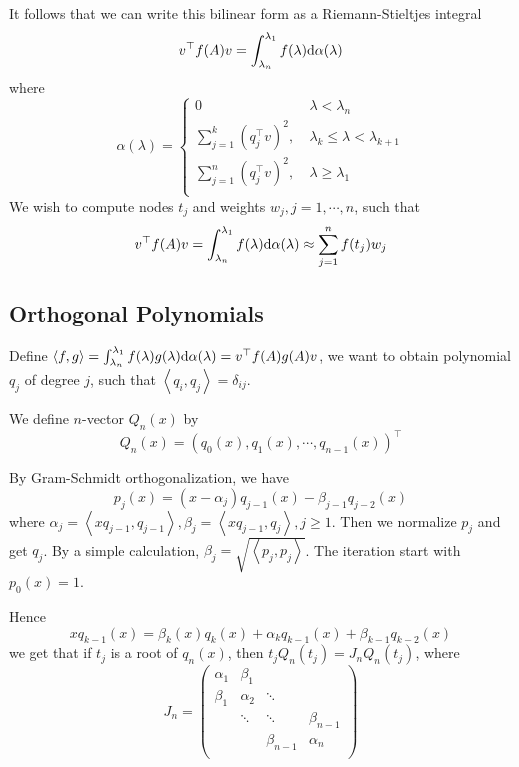 \documentclass[conference]{IEEEtran}
\DeclareMathOperator{\1}{\mathbf{1}}
\theoremstyle{definition}
\begin{document}
It follows that we can write this bilinear form as a Riemann-Stieltjes integral
\begin{equation}
    v^\top f(A) v = \int_{\lambda_n}^{\lambda_1} f(\lambda) {\rm d}\alpha(\lambda)
\end{equation}
where
\begin{equation}
    \label{eqn:distribute}
    \alpha(\lambda) = \begin{cases}
        0 &\lambda<\lambda_n\\
        \sum_{j=1}^k (q_j^\top v)^2,\ &\lambda_k\leq \lambda < \lambda_{k+1}\\
        \sum_{j=1}^n (q_j^\top v)^2,\ &\lambda \geq \lambda_{1}\\    
    \end{cases}
\end{equation}
We wish to compute nodes $t_j$ and weights $w_j, j = 1,\cdots,n$, such that
\begin{equation}
    v^\top f(A) v=\int_{\lambda_n}^{\lambda_1} f(\lambda) {\rm d}\alpha(\lambda) \approx \sum_{j=1}^n f(t_j) w_j
\end{equation}
\subsection{Orthogonal Polynomials}
Define $\left< f, g\right>=\int_{\lambda_n}^{\lambda_1} f(\lambda)g(\lambda) {\rm d} \alpha(\lambda)=v^\top f(A)g(A)v$, we want to obtain polynomial $q_j$ of degree $j$, such that $\left<q_i,q_j\right>=\delta_{ij}$. 

We define $n$-vector $Q_n(x)$ by
\begin{equation}
    Q_n(x) = \left(q_0(x),q_1(x),\cdots,q_{n-1}(x)\right)^\top
\end{equation}

By Gram-Schmidt orthogonalization, we have
\begin{equation}
    \label{eqn:trilation}
    p_j(x) = (x-\alpha_j)q_{j-1}(x)-\beta_{j-1}q_{j-2}(x)
\end{equation}
where $\alpha_j=\left<xq_{j-1},q_{j-1}\right>, \beta_j = \left<xq_{j-1},q_j\right>, j\geq 1$. Then we normalize $p_j$ and get $q_j$. By a simple calculation, $\beta_j=\sqrt{\left<p_j,p_j\right>}$. The iteration start with $p_0(x)=1$.

Hence
\begin{equation}
    xq_{k-1}(x)=\beta_k(x)q_k(x)+\alpha_k q_{k-1}(x) +\beta_{k-1}q_{k-2}(x)    
\end{equation}
we get that if $t_j$ is a root of $q_n(x)$, then $t_j Q_n(t_j)=J_nQ_n(t_j)$, where
\begin{equation}
    J_n=\left(\begin{matrix}
    \alpha_1 & \beta_1 &&\\
    \beta_1 &\alpha_2&\ddots&\\
    &\ddots&\ddots&\beta_{n-1}\\
    &&\beta_{n-1}&\alpha_n\\
    \end{matrix}\right)
\end{equation}
\end{document}
